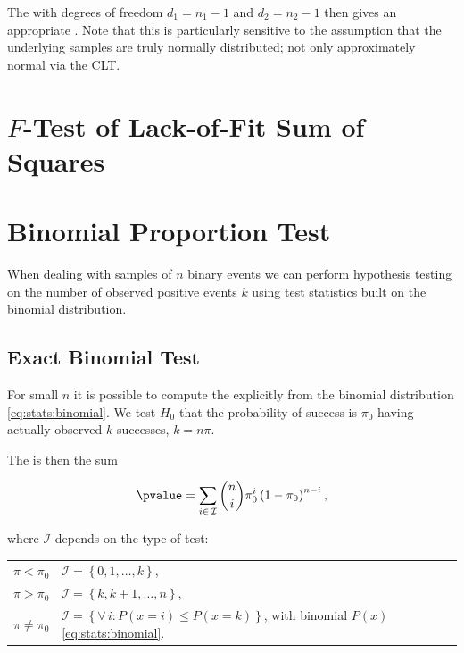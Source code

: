 The \Fdist with degrees of freedom $d_{1} = n_{1}-1$ and $d_{2} = n_{2}-1$
then gives an appropriate \pvalue.
Note that this \Ftest is particularly sensitive to the assumption that
the underlying samples are truly normally distributed;
not only approximately normal via the CLT.

\section{\texorpdfstring{$F$}{F}-Test of Lack-of-Fit Sum of Squares}
\label{hypo:F_test_fit}

\section{Binomial Proportion Test}
\label{hypo:binomial_test}

When dealing with samples of $n$ binary events we can perform hypothesis testing
on the number of observed positive events $k$
using test statistics built on the binomial distribution.

\subsection{Exact Binomial Test}
\label{hypo:binomial_test:exact}

For small $n$ it is possible to compute the \pvalue
explicitly from the binomial distribution \cref{eq:stats:binomial}.
We test $H_{0}$ that the probability of success is $\pi_{0}$
having actually observed $k$ successes, $k = n \pi$.

The \pvalue is then the sum

\begin{equation}\label{eq:hypo:binomial_test:exact}
\pvalue = \sum_{i \in \, \mathcal{I}} \binom{n}{i} \pi_{0}^{i} \left(1-\pi_{0}\right)^{n-i},
\end{equation}

\noindent where $\mathcal{I}$ depends on the type of test:

\begin{table}[H]
\centering
\begin{tabular}{l|l}
$\pi < \pi_{0}$ & $\mathcal{I} = \left\{0, 1, \ldots, k\right\}$, \\
$\pi > \pi_{0}$ & $\mathcal{I} = \left\{k, k+1, \ldots, n\right\}$, \\
$\pi \neq \pi_{0}$ & $\mathcal{I} = \left\{\forall \, i: P\left(x=i\right) \leq P\left(x = k\right)\right\}$, with binomial $P\left(x\right)$ \cref{eq:stats:binomial}.
\end{tabular}
\end{table}

